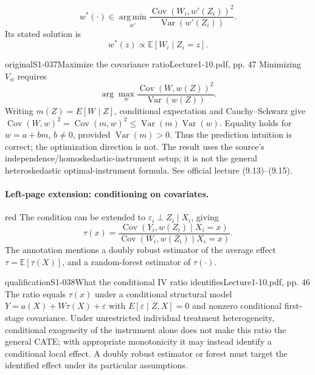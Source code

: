\[
 w^*(\cdot)\in\operatorname*{arg\,min}_{w'}
 \frac{\operatorname{Cov}(W_i,w'(Z_i))^2}{\operatorname{Var}(w'(Z_i))}.
\]
Its stated solution is
\[
 w^*(z)\propto\mathbb E[W_i\mid Z_i=z].
\]
\begin{reviewnote}{original}{S1-037}{Maximize the covariance ratio}{Lecture1-10.pdf, pp. 47}
Minimizing $V_w$ requires
\[
\arg\max_w\frac{\operatorname{Cov}(W,w(Z))^2}{\operatorname{Var}(w(Z))}.
\]
Writing $m(Z)=E[W\mid Z]$, conditional expectation and Cauchy--Schwarz give $\operatorname{Cov}(W,w)^2=\operatorname{Cov}(m,w)^2\le\operatorname{Var}(m)\operatorname{Var}(w)$. Equality holds for $w=a+bm$, $b\ne0$, provided $\operatorname{Var}(m)>0$. Thus the prediction intuition is correct; the optimization direction is not. The result uses the source's independence/homoskedastic-instrument setup; it is not the general heteroskedastic optimal-instrument formula. See official lecture (9.13)--(9.15).
\end{reviewnote}



\paragraph{Left-page extension: conditioning on covariates.}
\begin{inkblock}{red}
The condition can be extended to $\varepsilon_i\perp Z_i\mid X_i$, giving
\[
 \tau(x)=\frac{\operatorname{Cov}(Y_i,w(Z_i)\mid X_i=x)}
 {\operatorname{Cov}(W_i,w(Z_i)\mid X_i=x)}.
\]
The annotation mentions a doubly robust estimator of the average effect $\tau=\mathbb E[\tau(X)]$, and a random-forest estimator of $\tau(\cdot)$.
\end{inkblock}

\begin{reviewnote}{qualification}{S1-038}{What the conditional IV ratio identifies}{Lecture1-10.pdf, pp. 46}
The ratio equals $\tau(x)$ under a conditional structural model $Y=a(X)+W\tau(X)+\varepsilon$ with $E[\varepsilon\mid Z,X]=0$ and nonzero conditional first-stage covariance. Under unrestricted individual treatment heterogeneity, conditional exogeneity of the instrument alone does not make this ratio the general CATE; with appropriate monotonicity it may instead identify a conditional local effect. A doubly robust estimator or forest must target the identified effect under its particular assumptions.
\end{reviewnote}


